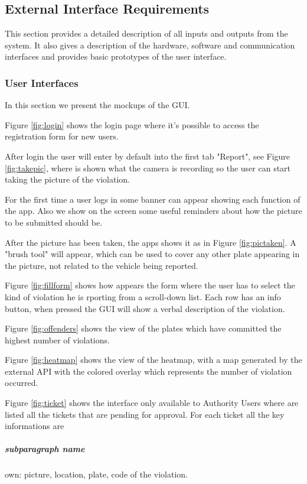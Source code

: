 \subsection{External Interface Requirements}
This section provides a detailed description of all inputs and outputs from the system. It also gives a description of the hardware, software and communication interfaces and provides basic prototypes of the user interface.

\subsubsection{User Interfaces}
In this section we present the mockups of the GUI.

Figure \ref{fig:login} shows the login page where it's possible to access the registration form for new users.

After login the user will enter by default into the first tab "Report", see Figure \ref{fig:takepic}, where is shown what the camera is recording so the user can start taking the picture of the violation.

For the first time a user logs in some banner can appear showing each function of the app. Also we show on the screen some useful reminders about how the picture to be submitted should be.

After the picture has been taken, the apps shows it as in Figure \ref{fig:pictaken}. A  "brush tool" will appear, which can be used to cover any other plate appearing in the picture, not related to the vehicle being reported.

Figure \ref{fig:fillform} shows how appears the form where the user has to select the kind of violation he is rporting from a scroll-down list. Each row has an info button, when pressed the GUI will show a verbal description of the violation.

Figure \ref{fig:offenders} shows the view of the plates which have committed the highest number of violations.

Figure \ref{fig:heatmap} shows the view of the heatmap, with a map generated by the external API with the colored overlay which represents the number of violation occurred.

Figure \ref{fig:ticket} shows the interface only available to Authority Users where are listed all the tickets that are pending for approval. For each ticket all the key informations are \subparagraph{subparagraph name}
own: picture, location, plate, code of the violation.

